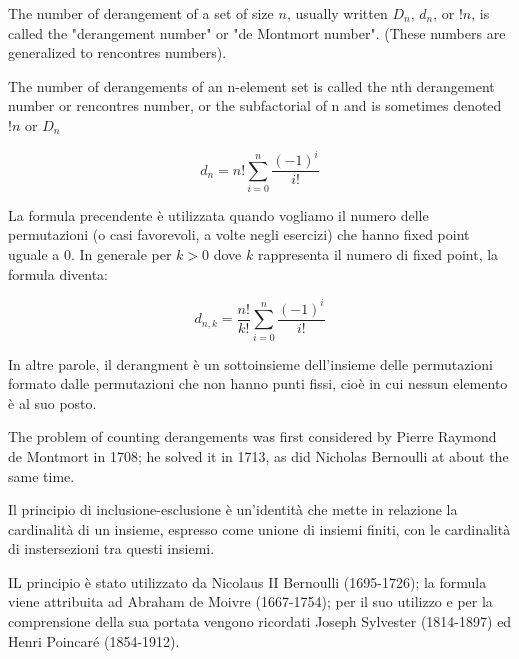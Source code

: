 \begin{definizione}
The number of derangement of a set of size $n$, usually written $D_{n}$, $d_{n}$, or $!n$, is called the "derangement number" or
"de Montmort number". (These numbers are generalized to rencontres numbers). 

The number of derangements of an n-element set is called the nth derangement number or rencontres number, or the subfactorial
of n and is sometimes denoted $!n$ or $D_{n}$
\end{definizione}

\begin{definizione}
\[
 d_{n} = n!\sum^{n}_{i=0} \frac{(-1)^i}{i!}
\]
\end{definizione}

\begin{definizione}
La formula precendente è utilizzata quando vogliamo il numero delle permutazioni (o casi favorevoli, a volte negli esercizi) che hanno fixed point uguale a 0.
In generale per $k>0$ dove $k$ rappresenta il numero di fixed point, la formula diventa:

\[
 d_{n,k} = \frac{n!}{k!}\sum^{n}_{i=0} \frac{(-1)^i}{i!}
\]

\end{definizione}

In altre parole, il derangment è un sottoinsieme dell'insieme delle permutazioni formato dalle permutazioni che non hanno punti fissi, cioè 
in cui nessun elemento è al suo posto.

The problem of counting derangements was first considered by Pierre Raymond de Montmort in 1708; he solved it in 1713, as did
Nicholas Bernoulli at about the same time. 

\begin{definizione}
Il principio di inclusione-esclusione è un'identità che mette in relazione la cardinalità di un insieme, espresso come unione di insiemi finiti,
con le cardinalità di instersezioni tra questi insiemi.
\end{definizione}

IL principio è stato utilizzato da Nicolaus II Bernoulli (1695-1726); la formula viene attribuita ad Abraham de Moivre (1667-1754);
per il suo utilizzo e per la comprensione della sua portata vengono ricordati Joseph Sylvester (1814-1897) ed Henri Poincaré (1854-1912). 



